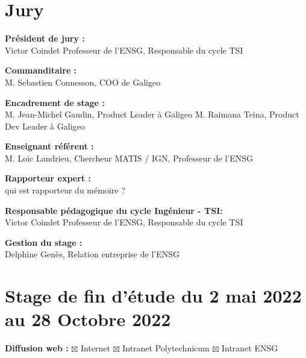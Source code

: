 \thispagestyle{plain}
\section*{Jury}
\vspace{0.5cm}

\textbf{Président de jury :} \\

Victor Coindet
Professeur de l'ENSG, Responsable du cycle TSI

\vspace{0.5cm}

\textbf{Commanditaire :} \\

M. Sebastien Connesson, COO de Galigeo

\vspace{0.5cm}

\textbf{Encadrement de stage :} \\ 

M. Jean-Michel Gaudin, Product Leader à Galigeo
M. Raimana Teina, Product Dev Leader à Galigeo

\vspace{0.5cm}

\textbf{Enseignant référent :} \\ 

M. Loic Landrieu, Chercheur MATIS / IGN, Professeur de l'ENSG

\vspace{0.5cm}

\textbf{Rapporteur expert :} \\ 

qui est rapporteur du mémoire ?

\vspace{0.5cm}

\textbf{Responsable pédagogique du cycle Ingénieur - TSI:} \\

Victor Coindet
Professeur de l'ENSG, Responsable du cycle TSI

\vspace{0.5cm}

\textbf{Gestion du stage :} \\ 

Delphine Genès, Relation entreprise de l'ENSG

\vspace{0.5cm}


\section*{Stage de fin d'étude du 2 mai 2022 au 28 Octobre 2022}
\vspace{0.3cm}
\textbf{Diffusion web :} $\boxtimes$ Internet \hspace{0.2cm}$\boxtimes$ Intranet Polytechnicum\hspace{0.2cm}
$\boxtimes$ Intranet ENSG\vspace{0.3cm}

